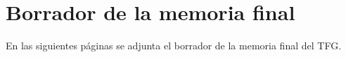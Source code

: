 
\section{Borrador de la memoria final}
\label{sec:borrador}

En las siguientes páginas se adjunta el borrador de la memoria final del
TFG.